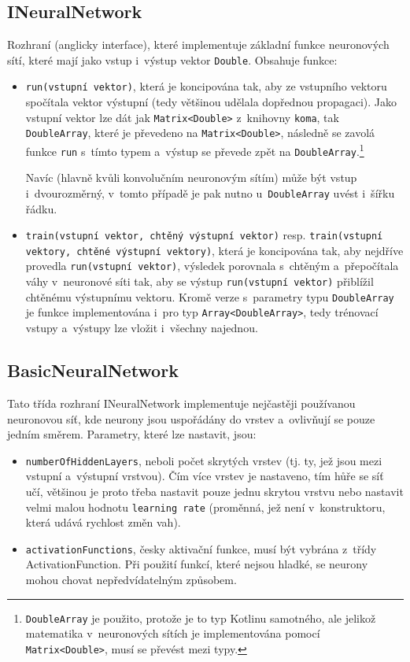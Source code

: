\documentclass[12pt]{report}			%
\begin{document}
				\subsection{INeuralNetwork}
					Rozhraní (anglicky \gls{interface}), které implementuje základní funkce neuronových sítí, které mají jako vstup i~výstup vektor \verb!Double!. Obsahuje funkce:
					\begin{itemize}
						\item \verb!run(vstupní vektor)!, která je koncipována tak, aby ze vstupního vektoru spočítala vektor výstupní (tedy většinou udělala dopřednou propagaci). Jako vstupní vektor lze dát jak \verb!Matrix<Double>! z~knihovny \verb!koma!, tak \verb!DoubleArray!, které je převedeno na \verb!Matrix<Double>!, následně se zavolá funkce \verb!run! s~tímto typem a~výstup se převede zpět na \verb!DoubleArray!.\footnote{\verb!DoubleArray! je použito, protože je to typ Kotlinu samotného, ale jelikož matematika v~neuronových sítích je implementována pomocí \verb!Matrix<Double>!, musí se převést mezi typy.}
						
						Navíc (hlavně kvůli konvolučním neuronovým sítím) může být vstup i~dvourozměrný, v~tomto případě je pak nutno u~\verb!DoubleArray! uvést i~šířku řádku.
						\item \verb!train(vstupní vektor, chtěný výstupní vektor)! resp. \verb!train(vstupní vektory, chtěné výstupní vektory)!, která je koncipována tak, aby nejdříve provedla \verb!run(vstupní vektor)!, výsledek porovnala s~chtěným a~přepočítala váhy v~neuronové síti tak, aby se výstup \verb!run(vstupní vektor)! přiblížil chtěnému výstupnímu vektoru. Kromě verze s~parametry typu \verb!DoubleArray! je funkce implementována i~pro typ \verb!Array<DoubleArray>!, tedy trénovací vstupy a~výstupy lze vložit i~všechny najednou.
					\end{itemize}
			
				\subsection{BasicNeuralNetwork}
					Tato třída rozhraní INeuralNetwork implementuje nejčastěji používanou neuronovou síť, kde neurony jsou uspořádány do vrstev a~ovlivňují se pouze jedním směrem. Parametry, které lze nastavit, jsou:
					\begin{itemize}
						\item \verb!numberOfHiddenLayers!, neboli počet skrytých vrstev (tj. ty, jež jsou mezi vstupní a~výstupní vrstvou). Čím více vrstev je nastaveno, tím hůře se síť učí, většinou je proto třeba nastavit pouze jednu skrytou vrstvu nebo nastavit velmi malou hodnotu \verb!learning rate! (proměnná, jež není v~konstruktoru, která udává rychlost změn vah).
						\item \verb!activationFunctions!, česky aktivační funkce, musí být vybrána z~třídy ActivationFunction. Při použití funkcí, které nejsou hladké, se neurony mohou chovat nepředvídatelným způsobem.
					\end{itemize}
					
\end{document}
